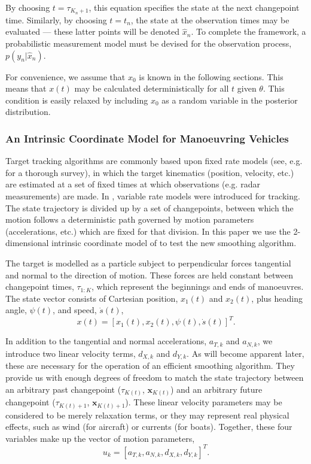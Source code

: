 \documentclass[peerreview,11pt,draftcls,onecolumn]{IEEEtran}
\begin{document}
By choosing $t = \tau_{K_{n}+1}$, this equation specifies the state at the next changepoint time. Similarly, by choosing $t=t_n$, the state at the observation times may be evaluated --- these latter points will be denoted $\hat{x}_n$. To complete the framework, a probabilistic measurement model must be devised for the observation process, $p(y_n|\hat{x}_n)$.

For convenience, we assume that $x_0$ is known in the following sections. This means that $x(t)$ may be calculated deterministically for all $t$ given $\theta$. This condition is easily relaxed by including $x_0$ as a random variable in the posterior distribution.



\subsubsection*{An Intrinsic Coordinate Model for Manoeuvring Vehicles} \label{sec:tracking_model}

Target tracking algorithms are commonly based upon fixed rate models (see, e.g. \cite{Li2003} for a thorough survey), in which the target kinematics (position, velocity, etc.) are estimated at a set of fixed times at which observations (e.g. radar measurements) are made. In \cite{Godsill2007a,Godsill2007,Whiteley2011,Bunch2012a}, variable rate models were introduced for tracking. The state trajectory is divided up by a set of changepoints, between which the motion follows a deterministic path governed by motion parameters (accelerations, etc.) which are fixed for that division. In this paper we use the 2-dimensional intrinsic coordinate model of \cite{Bunch2012a} to test the new smoothing algorithm.

The target is modelled as a particle subject to perpendicular forces tangential and normal to the direction of motion. These forces are held constant between changepoint times, $\tau_{1:K}$, which represent the beginnings and ends of manoeuvres. The state vector consists of Cartesian position, $x_1(t)$ and $x_2(t)$, plus heading angle, $\psi(t)$, and speed, $\dot{s}(t)$,
%
\begin{equation}
x(t) = [x_1(t), x_2(t), \psi(t), \dot{s}(t)]^T     .
\end{equation}

In addition to the tangential and normal accelerations, $a_{T,k}$ and $a_{N,k}$, we introduce two linear velocity terms, $d_{X,k}$ and $d_{Y,k}$. As will become apparent later, these are necessary for the operation of an efficient smoothing algorithm. They provide us with enough degrees of freedom to match the state trajectory between an arbitrary past changepoint ($\tau_{K(t)}$, $\mathbf{x}_{K(t)}$) and an arbitrary future changepoint ($\tau_{K(t)+1}$, $\mathbf{x}_{K(t)+1}$). These linear velocity parameters may be considered to be merely relaxation terms, or they may represent real physical effects, such as wind (for aircraft) or currents (for boats). Together, these four variables make up the vector of motion parameters,
%
\begin{equation}
u_k = [a_{T,k}, a_{N,k}, d_{X,k}, d_{Y,k}]^T     .
\end{equation}
\end{document}
